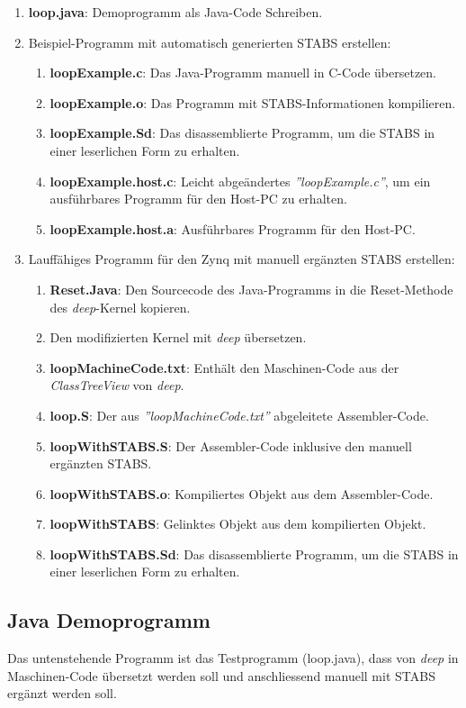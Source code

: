 \begin{enumerate}
	\item \textbf{loop.java}: Demoprogramm als Java-Code Schreiben.
	\item Beispiel-Programm mit automatisch generierten STABS erstellen:
	\begin{enumerate}
		\item \textbf{loopExample.c}: Das Java-Programm manuell in C-Code übersetzen.
		\item \textbf{loopExample.o}: Das Programm mit STABS-Informationen kompilieren.
		\item \textbf{loopExample.Sd}: Das disassemblierte Programm, um die STABS in einer leserlichen Form zu erhalten.
		\item \textbf{loopExample.host.c}: Leicht abgeändertes \textit{''loopExample.c''}, um ein ausführbares Programm für den Host-PC zu erhalten.
		\item \textbf{loopExample.host.a}: Ausführbares Programm für den Host-PC.
	\end{enumerate}
	\item Lauffähiges Programm für den Zynq mit manuell ergänzten STABS erstellen:
	\begin{enumerate}
		\item \textbf{Reset.Java}: Den Sourcecode des Java-Programms in die Reset-Methode des \textit{deep}-Kernel kopieren.
		\item Den modifizierten Kernel mit \textit{deep} übersetzen.
		\item \textbf{loopMachineCode.txt}: Enthält den Maschinen-Code aus der \textit{ClassTreeView} von \textit{deep}.
		\item \textbf{loop.S}: Der aus \textit{''loopMachineCode.txt''} abgeleitete Assembler-Code.
		\item \textbf{loopWithSTABS.S}: Der Assembler-Code inklusive den manuell ergänzten STABS.
		\item \textbf{loopWithSTABS.o}: Kompiliertes Objekt aus dem Assembler-Code.
		\item \textbf{loopWithSTABS}: Gelinktes Objekt aus dem kompilierten Objekt.
		\item \textbf{loopWithSTABS.Sd}: Das disassemblierte Programm, um die STABS in einer leserlichen Form zu erhalten.
	\end{enumerate}
\end{enumerate}



\subsection{Java Demoprogramm}
Das untenstehende Programm ist das Testprogramm (loop.java), dass von \textit{deep} in Maschinen-Code übersetzt werden soll und anschliessend manuell mit STABS ergänzt werden soll.

